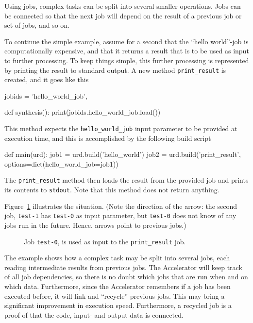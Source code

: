 Using jobs, complex tasks can be split into several smaller
operations.  Jobs can be connected so that the next job will depend on
the result of a previous job or set of jobs, and so on.

To continue the simple example, assume for a second that the ``hello
world''-job is computationally expensive, and that it returns a result
that is to be used as input to further processing.  To keep things
simple, this further processing is represented by printing the result
to standard output.  A new method \texttt{print\_result} is created,
and it goes like this
\begin{python}
jobids = {'hello_world_job',}

def synthesis():
    print(jobids.hello_world_job.load())
\end{python}
This method expects the \texttt{hello\_world\_job} input parameter to
be provided at execution time, and this is accomplished by the
following build script
\begin{python}
def main(urd):
    job1 = urd.build('hello_world')
    job2 = urd.build('print_result', options=dict(hello_world_job=job1))
\end{python}
The \texttt{print\_result} method then loads the result from the
provided job and prints its contents to \texttt{stdout}.  Note that
this method does not return anything.

Figure~\ref{fig:execflow-print-result} illustrates the situation.
(Note the direction of the arrow: the second job, \texttt{test-1} has
\texttt{test-0} as input parameter, but \texttt{test-0} does not know
of any jobs run in the future.  Hence, arrows point to previous jobs.)

\begin{figure}[h!]
  \begin{center}
    
    \caption{Job \texttt{test-0}, is used as input to the
      \texttt{print\_result} job.}
    \label{fig:execflow-print-result}
  \end{center}
\end{figure}

The example shows how a complex task may be split into several jobs,
each reading intermediate results from previous jobs.  The Accelerator
will keep track of all job dependencies, so there is no doubt which
jobs that are run when and on which data.  Furthermore, since the
Accelerator remembers if a job has been executed before, it will link
and ``recycle'' previous jobs.  This may bring a significant
improvement in execution speed.  Furthermore, a recycled job is a
proof of that the code, input- and output data is connected.



